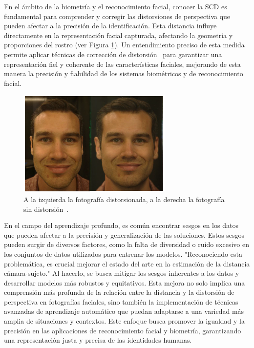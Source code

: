En el ámbito de la biometría y el reconocimiento facial, conocer la SCD es fundamental para comprender y corregir las distorsiones de perspectiva que pueden afectar a la precisión de la identificación. Esta distancia influye directamente en la representación facial capturada, afectando la geometría y proporciones del rostro (ver Figura \ref{fig2.1}). Un entendimiento preciso de esta medida permite aplicar técnicas de corrección de distorsión~\cite{16,17} para garantizar una representación fiel y coherente de las características faciales, mejorando de esta manera la precisión y fiabilidad de los sistemas biométricos y de reconocimiento facial.

\begin{figure}[h]
	\centering
	\includegraphics[scale=1]{imagenes/cap1/dist-nodist.png}
	\caption{A la izquierda la fotografía distorsionada, a la derecha la fotografía sin distorsión~\cite{17}.}
	\label{fig2.1}
\end{figure}


En el campo del aprendizaje profundo, es común encontrar sesgos \cite{28} en los datos que pueden afectar a la precisión y generalización de las soluciones. Estos sesgos pueden surgir de diversos factores, como la falta de diversidad o ruido excesivo en los conjuntos de datos utilizados para entrenar los modelos. 
"Reconociendo esta problemática, es crucial mejorar el estado del arte en la estimación de la distancia cámara-sujeto." Al hacerlo, se busca mitigar los sesgos inherentes a los datos y desarrollar modelos más robustos y equitativos. Esta mejora no solo implica una comprensión más profunda de la relación entre la distancia y la distorsión de perspectiva en fotografías faciales, sino también la implementación de técnicas avanzadas de aprendizaje automático que puedan adaptarse a una variedad más amplia de situaciones y contextos. Este enfoque busca promover la igualdad y la precisión en las aplicaciones de reconocimiento facial y biometría, garantizando una representación justa y precisa de las identidades humanas.


